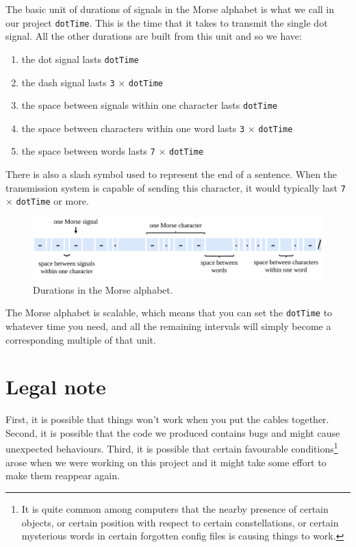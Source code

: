 \documentclass[10pt]{report}
\begin{document}
The basic unit of durations of signals in the Morse alphabet is what we call in our project \verb|dotTime|. This is the time that it takes to transmit the single dot signal. All the other durations are built from this unit and so we have:

\begin{enumerate}
\item the dot signal lasts \verb|dotTime|

\item the dash signal lasts \verb|3| $\times$ \verb|dotTime|

\item the space between signals within one character lasts \verb|dotTime|

\item the space between characters within one word lasts \verb|3| $\times$ \verb|dotTime|

\item the space between words lasts \verb|7| $\times$ \verb|dotTime|

\end{enumerate}

There is also a slash symbol used to represent the end of a sentence. When the transmission system is capable of sending this character, it would typically last \verb|7| $\times$ \verb|dotTime| or more.

\begin{figure}[H]
\centering\includegraphics[width=14.5cm]{morse_durations}
\caption{Durations in the Morse alphabet.}			
\label{fig:morse_durations}
\end{figure}

The Morse alphabet is scalable, which means that you can set the \verb|dotTime| to whatever time you need, and all the remaining intervals will simply become a corresponding multiple of that unit.

\section{Legal note}

First, it is possible that things won't work when you put the cables together. Second, it is possible that the code we produced contains bugs and might cause unexpected behaviours. Third, it is possible that certain favourable conditions\footnote{It is quite common among computers that the nearby presence of certain objects, or certain position with respect to certain constellations, or certain mysterious words in certain forgotten config files is causing things to work.} arose when we were working on this project and it might take some effort to make them reappear again.
\end{document}
